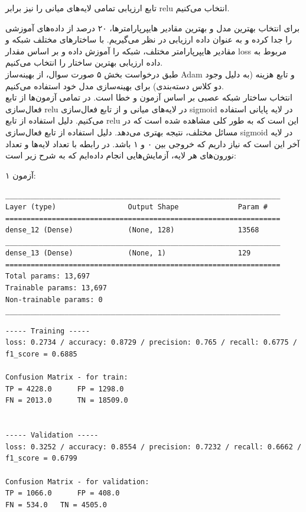 \documentclass{article}
\begin{document}
تابع ارزیابی تمامی لایه‌های میانی را نیز برابر relu انتخاب می‌کنیم.

برای انتخاب بهترین مدل و بهترین مقادیر هایپرپارامترها، ۲۰ درصد از داده‌های آموزشی را جدا کرده و به عنوان داده ارزیابی در نظر می‌گیریم. با ساختارهای مختلف شبکه و مقادیر هایپرپارامتر مختلف، شبکه را آموزش داده و بر اساس مقدار  loss مربوط به داده ارزیابی بهترین ساختار را انتخاب می‌کنیم. \\

طبق درخواست بخش ۵ صورت سوال، از بهینه‌ساز Adam و تابع هزینه  (به دلیل وجود دو کلاس دسته‌بندی) برای بهینه‌سازی مدل خود استفاده می‌کنیم. \\

انتخاب ساختار شبکه عصبی بر اساس آزمون و خطا است. در تمامی آزمون‌ها از تابع فعال‌سازی relu در لایه‌های میانی و از تابع فعال‌سازی sigmoid در لایه پایانی استفاده می‌کنیم. دلیل استفاده از تابع relu این است که به طور کلی مشاهده شده است که در مسائل مختلف، نتیجه بهتری می‌دهد. دلیل استفاده از تابع فعال‌سازی sigmoid در لایه‌ آخر این است که نیاز داریم که خروجی بین ۰ و ۱ باشد. در رابطه با تعداد لایه‌ها و تعداد نورون‌های هر لایه، آزمایش‌هایی انجام داده‌ایم که به شرح زیر است:



آزمون ۱:

\begin{latin}
\begin{lstlisting}
_________________________________________________________________
Layer (type)                 Output Shape              Param #   
=================================================================
dense_12 (Dense)             (None, 128)               13568     
_________________________________________________________________
dense_13 (Dense)             (None, 1)                 129       
=================================================================
Total params: 13,697
Trainable params: 13,697
Non-trainable params: 0
_________________________________________________________________
\end{lstlisting}
\end{latin}


\begin{latin}
\begin{lstlisting}
----- Training -----
loss: 0.2734 / accuracy: 0.8729 / precision: 0.765 / recall: 0.6775 /
f1_score = 0.6885

Confusion Matrix - for train:
TP = 4228.0 	 FP = 1298.0
FN = 2013.0 	 TN = 18509.0


----- Validation -----
loss: 0.3252 / accuracy: 0.8554 / precision: 0.7232 / recall: 0.6662 /
f1_score = 0.6799

Confusion Matrix - for validation:
TP = 1066.0 	 FP = 408.0
FN = 534.0 	 TN = 4505.0
\end{lstlisting}
\end{latin}
\end{document}
